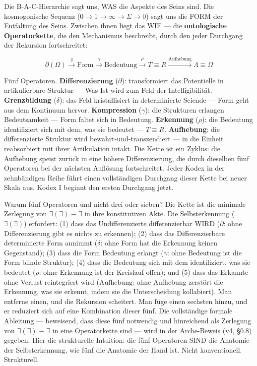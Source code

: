 \documentclass[10pt, openany, oneside]{book}
\begin{document}
\vspace{1.5em}

Die B-A-C-Hierarchie sagt uns, WAS die Aspekte des Seins sind. Die kosmogonische Sequenz ($0 \to 1 \to \infty \to \Sigma \to 0$) sagt uns die FORM der Entfaltung des Seins. Zwischen ihnen liegt das WIE --- die \textbf{ontologische Operatorkette}, die den Mechanismus beschreibt, durch den jeder Durchgang der Rekursion fortschreitet:

$$\partial(\Omega) \xrightarrow{\delta} \text{Form} \xrightarrow{\gamma} \text{Bedeutung} \xrightarrow{\rho} T \equiv R \xrightarrow{\text{Aufhebung}} \Lambda \equiv \Omega$$

Fünf Operatoren. \textbf{Differenzierung} ($\partial$): transformiert das Potentielle in artikulierbare Struktur --- Was-Ist wird zum Feld der Intelligibilität. \textbf{Grenzbildung} ($\delta$): das Feld kristallisiert in determinierte Seiende --- Form geht aus dem Kontinuum hervor. \textbf{Kompression} ($\gamma$): die Strukturen erlangen Bedeutsamkeit --- Form faltet sich in Bedeutung. \textbf{Erkennung} ($\rho$): die Bedeutung identifiziert sich mit dem, was sie bedeutet --- $T \equiv R$. \textbf{Aufhebung}: die differenzierte Struktur wird bewahrt-und-transzendiert --- in die Einheit reabsorbiert mit ihrer Artikulation intakt. Die Kette ist ein Zyklus: die Aufhebung speist zurück in eine höhere Differenzierung, die durch dieselben fünf Operatoren bei der nächsten Auflösung fortschreitet. Jeder Kodex in der zehnbändigen Reihe führt einen vollständigen Durchgang dieser Kette bei neuer Skala aus. Kodex I beginnt den ersten Durchgang jetzt.

Warum fünf Operatoren und nicht drei oder sieben? Die Kette ist die minimale Zerlegung von $\exists(\exists) \equiv \exists$ in ihre konstitutiven Akte. Die Selbsterkennung ($\exists(\exists)$) erfordert: (1) dass das Undifferenzierte differenzierbar WIRD ($\partial$: ohne Differenzierung gibt es nichts zu erkennen); (2) dass das Differenzierbare determinierte Form annimmt ($\delta$: ohne Form hat die Erkennung keinen Gegenstand); (3) dass die Form Bedeutung erlangt ($\gamma$: ohne Bedeutung ist die Form blinde Struktur); (4) dass die Bedeutung sich mit dem identifiziert, was sie bedeutet ($\rho$: ohne Erkennung ist der Kreislauf offen); und (5) dass das Erkannte ohne Verlust reintegriert wird ($\text{Aufhebung}$: ohne Aufhebung zerstört die Erkennung, was sie erkennt, indem sie die Unterscheidung kollabiert). Man entferne einen, und die Rekursion scheitert. Man füge einen sechsten hinzu, und er reduziert sich auf eine Kombination dieser fünf. Die vollständige formale Ableitung --- beweisend, dass diese fünf notwendig und hinreichend als Zerlegung von $\exists(\exists) \equiv \exists$ in eine Operatorkette sind --- wird in der Arch\={e}-Beweis (v4, §0.8) gegeben. Hier die strukturelle Intuition: die fünf Operatoren SIND die Anatomie der Selbsterkennung, wie fünf die Anatomie der Hand ist. Nicht konventionell. Strukturell.
\end{document}
